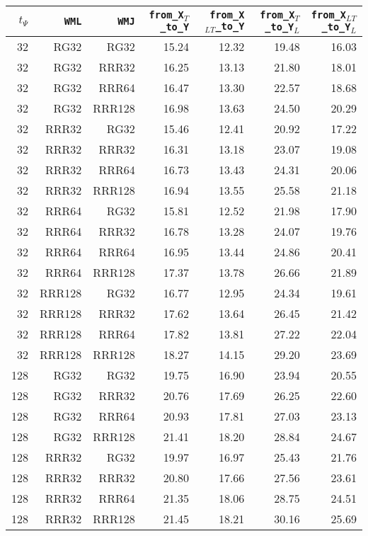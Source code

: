 \begin{table}
\begin{tabular}{|r|r|r|r|r|r|r|}
\hline
$t_{\Psi}$ & \texttt{WML} & \texttt{WMJ} & \texttt{from\_X$_{T}$\_to\_Y} & \texttt{from\_X$_{LT}$\_to\_Y} & \texttt{from\_X$_{T}$\_to\_Y$_{L}$} & \texttt{from\_X$_{LT}$\_to\_Y$_{L}$} \\
\hline
32 & RG32 & RG32 & 15.24 & 12.32 & 19.48 & 16.03 \\
32 & RG32 & RRR32 & 16.25 & 13.13 & 21.80 & 18.01 \\
32 & RG32 & RRR64 & 16.47 & 13.30 & 22.57 & 18.68 \\
32 & RG32 & RRR128 & 16.98 & 13.63 & 24.50 & 20.29 \\
32 & RRR32 & RG32 & 15.46 & 12.41 & 20.92 & 17.22 \\
32 & RRR32 & RRR32 & 16.31 & 13.18 & 23.07 & 19.08 \\
32 & RRR32 & RRR64 & 16.73 & 13.43 & 24.31 & 20.06 \\
32 & RRR32 & RRR128 & 16.94 & 13.55 & 25.58 & 21.18 \\
32 & RRR64 & RG32 & 15.81 & 12.52 & 21.98 & 17.90 \\
32 & RRR64 & RRR32 & 16.78 & 13.28 & 24.07 & 19.76 \\
32 & RRR64 & RRR64 & 16.95 & 13.44 & 24.86 & 20.41 \\
32 & RRR64 & RRR128 & 17.37 & 13.78 & 26.66 & 21.89 \\
32 & RRR128 & RG32 & 16.77 & 12.95 & 24.34 & 19.61 \\
32 & RRR128 & RRR32 & 17.62 & 13.64 & 26.45 & 21.42 \\
32 & RRR128 & RRR64 & 17.82 & 13.81 & 27.22 & 22.04 \\
32 & RRR128 & RRR128 & 18.27 & 14.15 & 29.20 & 23.69 \\
128 & RG32 & RG32 & 19.75 & 16.90 & 23.94 & 20.55 \\
128 & RG32 & RRR32 & 20.76 & 17.69 & 26.25 & 22.60 \\
128 & RG32 & RRR64 & 20.93 & 17.81 & 27.03 & 23.13 \\
128 & RG32 & RRR128 & 21.41 & 18.20 & 28.84 & 24.67 \\
128 & RRR32 & RG32 & 19.97 & 16.97 & 25.43 & 21.76 \\
128 & RRR32 & RRR32 & 20.80 & 17.66 & 27.56 & 23.61 \\
128 & RRR32 & RRR64 & 21.35 & 18.06 & 28.75 & 24.51 \\
128 & RRR32 & RRR128 & 21.45 & 18.21 & 30.16 & 25.69 \\

\end{tabular}
\end{table}
